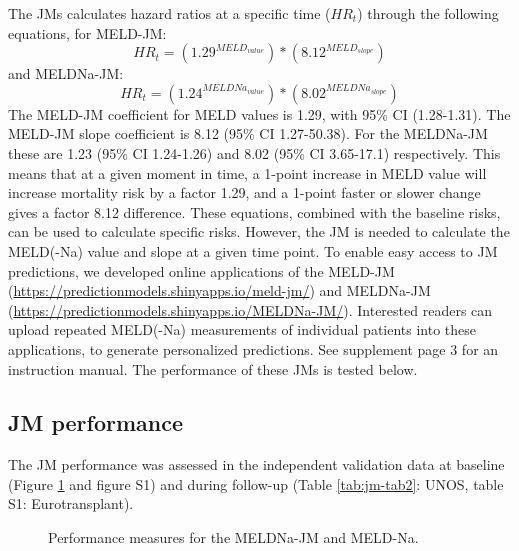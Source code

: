 \documentclass[11pt,english,]{book} %
\begin{document}
The JMs calculates hazard ratios at a specific time (\(HR_{t}\)) through the following equations, for MELD-JM: \[{HR}_t=\left({1.29}^{{MELD}_{value}}\right)\ast\left({8.12}^{{MELD}_{slope}}\right)\] and MELDNa-JM: \[{HR}_t=\left({1.24}^{{MELDNa}_{value}}\right)\ast\left({8.02}^{{MELDNa}_{slope}}\right)\] The MELD-JM coefficient for MELD values is 1.29, with 95\% CI (1.28-1.31). The MELD-JM slope coefficient is 8.12 (95\% CI 1.27-50.38). For the MELDNa-JM these are 1.23 (95\% CI 1.24-1.26) and 8.02 (95\% CI 3.65-17.1) respectively. This means that at a given moment in time, a 1-point increase in MELD value will increase mortality risk by a factor 1.29, and a 1-point faster or slower change gives a factor 8.12 difference. These equations, combined with the baseline risks, can be used to calculate specific risks. However, the JM is needed to calculate the MELD(-Na) value and slope at a given time point. To enable easy access to JM predictions, we developed online applications of the MELD-JM (\url{https://predictionmodels.shinyapps.io/meld-jm/}) and MELDNa-JM (\url{https://predictionmodels.shinyapps.io/MELDNa-JM/}). Interested readers can upload repeated MELD(-Na) measurements of individual patients into these applications, to generate personalized predictions. See supplement page 3 for an instruction manual. The performance of these JMs is tested below.

\hypertarget{jm-performance}{%
\subsection*{JM performance}\label{jm-performance}}

The JM performance was assessed in the independent validation data at baseline (Figure \ref{fig:jm-fig2} and figure S1) and during follow-up (Table \ref{tab:jm-tab2}: UNOS, table S1: Eurotransplant).

\begin{figure}
\newline{}\caption{Performance measures for the MELDNa-JM and MELD-Na.}\label{fig:jm-fig2}
\end{figure}
\end{document}
